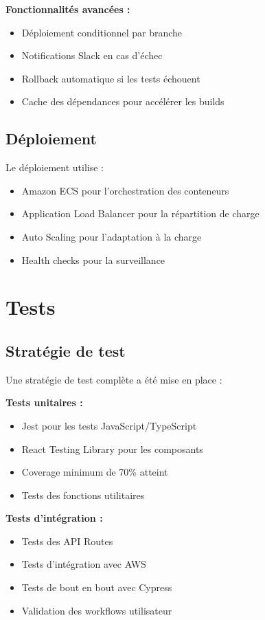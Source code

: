 \textbf{Fonctionnalités avancées :}
\begin{itemize}
    \item Déploiement conditionnel par branche
    \item Notifications Slack en cas d'échec
    \item Rollback automatique si les tests échouent
    \item Cache des dépendances pour accélérer les builds
\end{itemize}

\subsection{Déploiement}

Le déploiement utilise :
\begin{itemize}
    \item Amazon ECS pour l'orchestration des conteneurs
    \item Application Load Balancer pour la répartition de charge
    \item Auto Scaling pour l'adaptation à la charge
    \item Health checks pour la surveillance
\end{itemize}

\section{Tests}

\subsection{Stratégie de test}

Une stratégie de test complète a été mise en place :

\textbf{Tests unitaires :}
\begin{itemize}
    \item Jest pour les tests JavaScript/TypeScript
    \item React Testing Library pour les composants
    \item Coverage minimum de 70\% atteint
    \item Tests des fonctions utilitaires
\end{itemize}

\textbf{Tests d'intégration :}
\begin{itemize}
    \item Tests des API Routes
    \item Tests d'intégration avec AWS
    \item Tests de bout en bout avec Cypress
    \item Validation des workflows utilisateur
\end{itemize}

